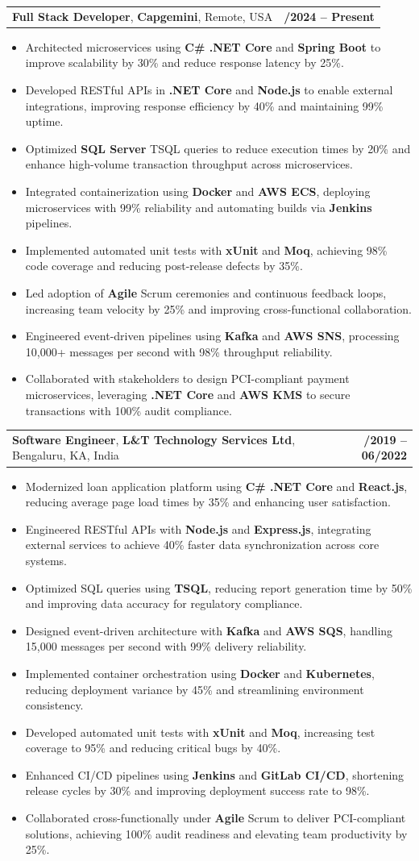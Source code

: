 \documentclass[letterpaper,11pt]{article}
\makeatletter
\newcommand{\resumeItem}[1]{
  \item\footnotesize{
    {#1 \vspace{-2pt}}
  }
}
\newcommand{\resumeSubheading}[4]{
  \vspace{-2pt}\item
    \begin{tabular*}{1.0\textwidth}[t]{l@{\extracolsep{\fill}}r}
      \textbf{\fontsize{10pt}{14pt}\selectfont #3}, \textbf{\fontsize{10pt}{14pt}\selectfont #1}, \fontsize{10pt}{14pt}\selectfont #4 & \textbf{\fontsize{10pt}{14pt}\selectfont #2} \\
    \end{tabular*}\vspace{-7pt}
}
\newcommand{\resumeItemListStart}{\begin{itemize}[leftmargin=*]}
\newcommand{\resumeItemListEnd}{\end{itemize}\vspace{-5pt}}
\makeatother
\begin{document}
    \resumeSubheading
        {Capgemini}{01/2024 -- Present}
        {Full Stack Developer}{Remote, USA}
      \resumeItemListStart
        \resumeItem{Architected microservices using \textbf{C\# .NET Core} and \textbf{Spring Boot} to improve scalability by 30\% and reduce response latency by 25\%.}
        \resumeItem{Developed RESTful APIs in \textbf{.NET Core} and \textbf{Node.js} to enable external integrations, improving response efficiency by 40\% and maintaining 99\% uptime.}
        \resumeItem{Optimized \textbf{SQL Server} TSQL queries to reduce execution times by 20\% and enhance high-volume transaction throughput across microservices.}
        \resumeItem{Integrated containerization using \textbf{Docker} and \textbf{AWS ECS}, deploying microservices with 99\% reliability and automating builds via \textbf{Jenkins} pipelines.}
        \resumeItem{Implemented automated unit tests with \textbf{xUnit} and \textbf{Moq}, achieving 98\% code coverage and reducing post-release defects by 35\%.}
        \resumeItem{Led adoption of \textbf{Agile} Scrum ceremonies and continuous feedback loops, increasing team velocity by 25\% and improving cross-functional collaboration.}
        \resumeItem{Engineered event-driven pipelines using \textbf{Kafka} and \textbf{AWS SNS}, processing 10,000+ messages per second with 98\% throughput reliability.}
        \resumeItem{Collaborated with stakeholders to design PCI-compliant payment microservices, leveraging \textbf{.NET Core} and \textbf{AWS KMS} to secure transactions with 100\% audit compliance.}
      \resumeItemListEnd

    \resumeSubheading
        {L\&T Technology Services Ltd}{08/2019 -- 06/2022}
        {Software Engineer}{Bengaluru, KA, India}
      \resumeItemListStart
        \resumeItem{Modernized loan application platform using \textbf{C\# .NET Core} and \textbf{React.js}, reducing average page load times by 35\% and enhancing user satisfaction.}
        \resumeItem{Engineered RESTful APIs with \textbf{Node.js} and \textbf{Express.js}, integrating external services to achieve 40\% faster data synchronization across core systems.}
        \resumeItem{Optimized SQL queries using \textbf{TSQL}, reducing report generation time by 50\% and improving data accuracy for regulatory compliance.}
        \resumeItem{Designed event-driven architecture with \textbf{Kafka} and \textbf{AWS SQS}, handling 15,000 messages per second with 99\% delivery reliability.}
        \resumeItem{Implemented container orchestration using \textbf{Docker} and \textbf{Kubernetes}, reducing deployment variance by 45\% and streamlining environment consistency.}
        \resumeItem{Developed automated unit tests with \textbf{xUnit} and \textbf{Moq}, increasing test coverage to 95\% and reducing critical bugs by 40\%.}
        \resumeItem{Enhanced CI/CD pipelines using \textbf{Jenkins} and \textbf{GitLab CI/CD}, shortening release cycles by 30\% and improving deployment success rate to 98\%.}
        \resumeItem{Collaborated cross-functionally under \textbf{Agile} Scrum to deliver PCI-compliant solutions, achieving 100\% audit readiness and elevating team productivity by 25\%.}
      \resumeItemListEnd
\end{document}
